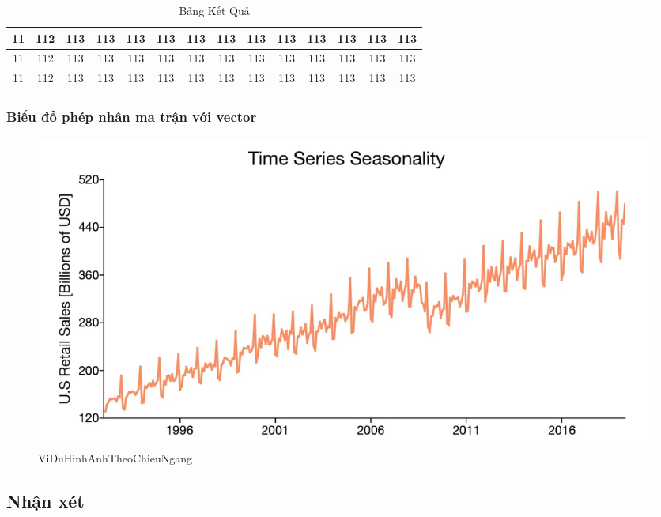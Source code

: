 \begin{table}[H]
{\begin{tabular}{|c|c|c|c|c|c|c|c|c|c|c|c|c|c|}
            \hline
            11                  & 112                        & 113                                              & 113                                              & 113                                              & 113                                              & 113                                              & 113                                              & 113                & 113                & 113                & 113                & 113                & 113                \\
            \hline
            11                  & 112                        & 113                                              & 113                                              & 113                                              & 113                                              & 113                                              & 113                                              & 113                & 113                & 113                & 113                & 113                & 113                \\
            \hline
            11                  & 112                        & 113                                              & 113                                              & 113                                              & 113                                              & 113                                              & 113                                              & 113                & 113                & 113                & 113                & 113                & 113                \\
            \hline
        \end{tabular}
    }
    \caption{Bảng Kết Quả}
    \label{table:nghia1}
\end{table}

\newpage
\subsubsection{Biểu đồ phép nhân ma trận với vector}


\begin{figure}[h] %
    \centering
    \includegraphics[width=1\textwidth]{pictures/ts-pp-seasonality.jpg} %
    \caption{ViDuHinhAnhTheoChieuNgang} %
    \label{pictures:nghia12} %
\end{figure}


\subsection{Nhận xét}
\lipsum[1]


